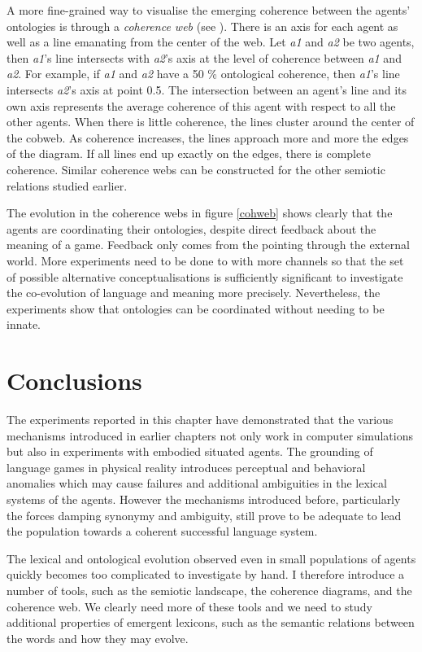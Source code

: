 A more fine-grained way to visualise the emerging
coherence between the agents' ontologies is 
through a {\itshape coherence web} (see ). 
There is an axis for each agent as well as
a line emanating from the center of the web.
Let \emph{a1} and \emph{a2} be two 
agents, then \emph{a1}'s line intersects with \emph{a2}'s axis at the 
level of coherence between \emph{a1} and \emph{a2}. For example, if \emph{a1}
and \emph{a2} have a 50 \% ontological coherence, then \emph{a1}'s
line intersects \emph{a2}'s axis at point 0.5. The intersection between 
an agent's line and its own axis represents the average 
coherence of this agent with respect to all the other
agents. When there is little 
coherence, the lines cluster around the center of the cobweb. 
As coherence increases, the lines approach more and more the edges
of the diagram. If all lines end up exactly
on the edges, there is complete coherence. Similar coherence
webs can be constructed for the other semiotic 
relations studied earlier.  

The evolution in the coherence webs in figure 
\ref{cohweb} shows clearly that the agents are 
coordinating their ontologies, despite direct feedback 
about the meaning of a game. Feedback only comes from 
the pointing through the external world. More experiments
need to be done to with more channels so that the 
set of possible alternative conceptualisations is 
sufficiently significant to investigate the co-evolution 
of language and meaning more precisely. Nevertheless, 
the experiments show that ontologies can be coordinated
without needing to be innate. 

\section{Conclusions}

The experiments reported in this chapter have
demonstrated that 
the various mechanisms introduced in earlier chapters
not only work in computer simulations but also in 
experiments with embodied situated agents. 
The grounding of language games in physical 
reality introduces perceptual and behavioral anomalies 
which may cause failures and additional ambiguities
in the lexical systems of the agents. However the 
mechanisms introduced before, particularly the 
forces damping synonymy and ambiguity, still prove to 
be adequate to lead the population towards a 
coherent successful language system. 

The lexical and ontological evolution observed even 
in small populations of agents quickly becomes 
too complicated to investigate by hand. I therefore
introduce a number of tools, such as the semiotic
landscape, the coherence diagrams, and the coherence
web. We clearly need more of these tools and we 
need to study additional properties of emergent 
lexicons, such as the semantic relations between 
the words and how they may evolve. 

